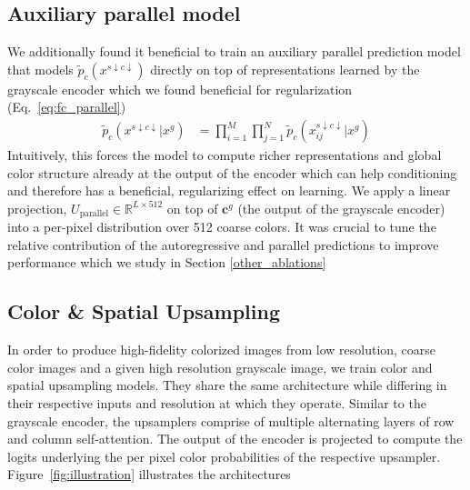 \documentclass{article} \usepackage{iclr2021_conference,times}
\newcommand{\bb}[1]{\mathbf{#1}}
\newcommand{\bc}{\bb{c}}
\newcommand{\da}{{\scriptscriptstyle\downarrow}}
\begin{document}
\subsection{Auxiliary parallel model}
\label{aux_pred_model}

We additionally found it beneficial to train an auxiliary parallel prediction model that models $\widetilde{p}_c(x^{s\da c\da})$ directly on top of representations learned by the grayscale encoder  which we found beneficial for regularization (Eq.~\ref{eq:fc_parallel})
\begin{align}
 \widetilde{p}_c(x^{s\da c\da}|x^g) &= \prod_{i=1}^M\prod_{j=1}^N \widetilde{p}_c(x^{s\da c\da}_{ij} | x^{g}) \label{eq:fc_parallel} 
\end{align}
Intuitively, this forces the model to compute richer representations and global color structure already at the output of the encoder which can help conditioning and therefore has a beneficial, regularizing effect on learning.
We apply a linear projection, $U_{\text{parallel}} \in \mathbb{R}^{L {\times} 512}$ on top of $\bc^{g}$ (the output of the grayscale encoder) into a per-pixel distribution over 512 coarse colors. It was crucial to tune the relative contribution of the autoregressive and parallel predictions to improve performance which we study in Section \ref{other_ablations}


\subsection{Color \& Spatial Upsampling}
\label{upsamplers}

In order to produce high-fidelity colorized images from low resolution, coarse color images and a given high resolution grayscale image, we train color and spatial upsampling models. They share the same architecture while differing in their respective inputs and resolution at which they operate. Similar to the grayscale encoder, the upsamplers comprise of multiple alternating layers of row and column self-attention. The output of the encoder is projected to compute the logits underlying the per pixel color probabilities of the respective upsampler. Figure~\ref{fig:illustration} illustrates the architectures
\end{document}
